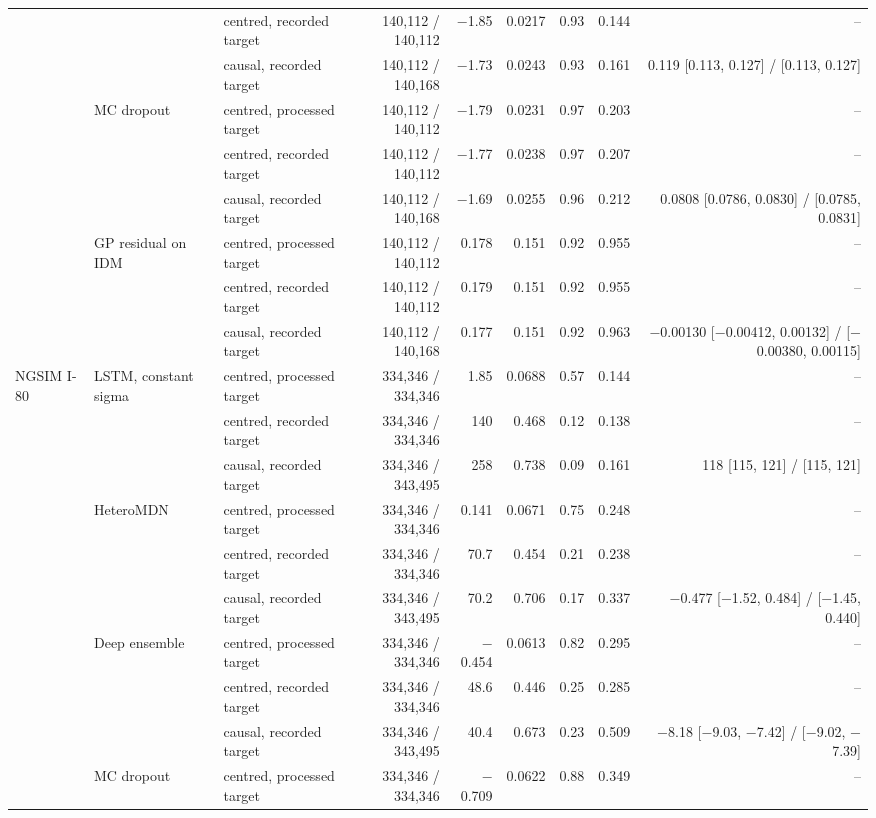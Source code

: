 \begin{longtable}{lllrrrrrr}
 &  & centred, recorded target & 140,112 / 140,112 & $-$1.85 & 0.0217 & 0.93 & 0.144 & -- \\
 &  & causal, recorded target & 140,112 / 140,168 & $-$1.73 & 0.0243 & 0.93 & 0.161 & 0.119 [0.113, 0.127] / [0.113, 0.127] \\
\midrule
 & MC dropout & centred, processed target & 140,112 / 140,112 & $-$1.79 & 0.0231 & 0.97 & 0.203 & -- \\
 &  & centred, recorded target & 140,112 / 140,112 & $-$1.77 & 0.0238 & 0.97 & 0.207 & -- \\
 &  & causal, recorded target & 140,112 / 140,168 & $-$1.69 & 0.0255 & 0.96 & 0.212 & 0.0808 [0.0786, 0.0830] / [0.0785, 0.0831] \\
\midrule
 & GP residual on IDM & centred, processed target & 140,112 / 140,112 & 0.178 & 0.151 & 0.92 & 0.955 & -- \\
 &  & centred, recorded target & 140,112 / 140,112 & 0.179 & 0.151 & 0.92 & 0.955 & -- \\
 &  & causal, recorded target & 140,112 / 140,168 & 0.177 & 0.151 & 0.92 & 0.963 & $-$0.00130 [$-$0.00412, 0.00132] / [$-$0.00380, 0.00115] \\
\midrule
NGSIM I-80 & LSTM, constant sigma & centred, processed target & 334,346 / 334,346 & 1.85 & 0.0688 & 0.57 & 0.144 & -- \\
 &  & centred, recorded target & 334,346 / 334,346 & 140 & 0.468 & 0.12 & 0.138 & -- \\
 &  & causal, recorded target & 334,346 / 343,495 & 258 & 0.738 & 0.09 & 0.161 & 118 [115, 121] / [115, 121] \\
\midrule
 & HeteroMDN & centred, processed target & 334,346 / 334,346 & 0.141 & 0.0671 & 0.75 & 0.248 & -- \\
 &  & centred, recorded target & 334,346 / 334,346 & 70.7 & 0.454 & 0.21 & 0.238 & -- \\
 &  & causal, recorded target & 334,346 / 343,495 & 70.2 & 0.706 & 0.17 & 0.337 & $-$0.477 [$-$1.52, 0.484] / [$-$1.45, 0.440] \\
\midrule
 & Deep ensemble & centred, processed target & 334,346 / 334,346 & $-$0.454 & 0.0613 & 0.82 & 0.295 & -- \\
 &  & centred, recorded target & 334,346 / 334,346 & 48.6 & 0.446 & 0.25 & 0.285 & -- \\
 &  & causal, recorded target & 334,346 / 343,495 & 40.4 & 0.673 & 0.23 & 0.509 & $-$8.18 [$-$9.03, $-$7.42] / [$-$9.02, $-$7.39] \\
\midrule
 & MC dropout & centred, processed target & 334,346 / 334,346 & $-$0.709 & 0.0622 & 0.88 & 0.349 & -- \\

\end{longtable}

